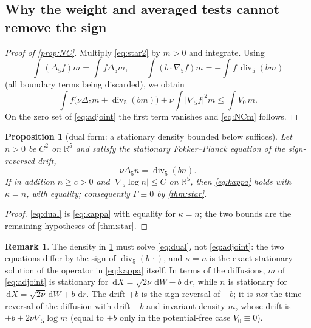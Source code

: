 \documentclass[11pt]{article}
\newtheorem{proposition}[theorem]{Proposition}
\theoremstyle{definition}
\newtheorem{remark}[theorem]{Remark}
\newcommand{\R}{\mathbb{R}}
\newcommand{\dd}{\,\mathrm{d}}
\newcommand{\Div}{\operatorname{div}}
\begin{document}
\subsection{Why the weight and averaged tests cannot remove the sign}
\begin{proof}[Proof of \cref{prop:NC}]
Multiply \eqref{eq:star2} by $m>0$ and integrate. Using
\begin{equation}
\int(\Delta_5f)m=\int f\Delta_5m,\qquad
\int(b\cdot\nabla_5f)m=-\int f\,\Div_5(bm)
\end{equation}
(all boundary terms being discarded), we obtain
\begin{equation}
\int f\bigl(\nu\Delta_5m+\Div_5(bm)\bigr)+\nu\int|\nabla_5f|^2m
\le\int V_0\,m .
\end{equation}
On the zero set of \eqref{eq:adjoint} the first term vanishes and
\eqref{eq:NCm} follows.
\end{proof}

\begin{proposition}[dual form: a stationary density bounded below suffices]
\label{prop:dual}
Let $n>0$ be $C^2$ on $\R^5$ and satisfy the stationary Fokker--Planck
equation of the sign-reversed drift,
\begin{equation}\label{eq:dual}
\nu\Delta_5n=\Div_5(bn).
\end{equation}
If in addition $n\ge c>0$ and $|\nabla_5\log n|\le C$ on $\R^5$, then
\eqref{eq:kappa} holds with $\kappa=n$, with equality; consequently
$\Gamma\equiv0$ by \cref{thm:star}.
\end{proposition}
\begin{proof}
\eqref{eq:dual} is \eqref{eq:kappa} with equality for $\kappa=n$; the two
bounds are the remaining hypotheses of \cref{thm:star}.
\end{proof}
\begin{remark}
The density in \cref{prop:dual} must solve \eqref{eq:dual}, not
\eqref{eq:adjoint}: the two equations differ by the sign of $\Div_5(b\,\cdot)$,
and $\kappa=n$ is the exact stationary solution of the operator in
\eqref{eq:kappa} itself. In terms of the diffusions, $m$ of \eqref{eq:adjoint}
is stationary for $\dd X=\sqrt{2\nu}\dd W-b\,\dd r$, while $n$ is stationary
for $\dd X=\sqrt{2\nu}\dd W+b\,\dd r$. The drift $+b$ is the sign reversal of
$-b$; it is \emph{not} the time reversal of the diffusion with drift $-b$ and
invariant density $m$, whose drift is $+b+2\nu\nabla_5\log m$ (equal to $+b$
only in the potential-free case $V_0\equiv0$).
\end{remark}
\end{document}
